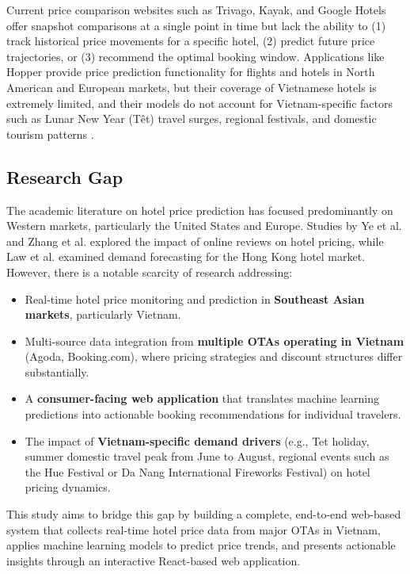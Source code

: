 \documentclass[12pt,a4paper]{report}
\begin{document}
Current price comparison websites such as Trivago, Kayak, and Google Hotels offer snapshot comparisons at a single point in time but lack the ability to (1) track historical price movements for a specific hotel, (2) predict future price trajectories, or (3) recommend the optimal booking window. Applications like Hopper provide price prediction functionality for flights and hotels in North American and European markets, but their coverage of Vietnamese hotels is extremely limited, and their models do not account for Vietnam-specific factors such as Lunar New Year (T\^{e}t) travel surges, regional festivals, and domestic tourism patterns \cite{hopper2023}.

\subsection{Research Gap}

The academic literature on hotel price prediction has focused predominantly on Western markets, particularly the United States and Europe. Studies by Ye et al. \cite{ye2009} and Zhang et al. \cite{zhang2011} explored the impact of online reviews on hotel pricing, while Law et al. \cite{law2019} examined demand forecasting for the Hong Kong hotel market. However, there is a notable scarcity of research addressing:

\begin{itemize}
    \item Real-time hotel price monitoring and prediction in \textbf{Southeast Asian markets}, particularly Vietnam.
    \item Multi-source data integration from \textbf{multiple OTAs operating in Vietnam} (Agoda, Booking.com), where pricing strategies and discount structures differ substantially.
    \item A \textbf{consumer-facing web application} that translates machine learning predictions into actionable booking recommendations for individual travelers.
    \item The impact of \textbf{Vietnam-specific demand drivers} (e.g., Tet holiday, summer domestic travel peak from June to August, regional events such as the Hue Festival or Da Nang International Fireworks Festival) on hotel pricing dynamics.
\end{itemize}

This study aims to bridge this gap by building a complete, end-to-end web-based system that collects real-time hotel price data from major OTAs in Vietnam, applies machine learning models to predict price trends, and presents actionable insights through an interactive React-based web application.
\end{document}
